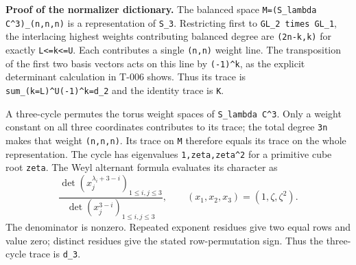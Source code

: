 \documentclass[
  10pt,
]{article}
\begin{document}
\textbf{Proof of the normalizer dictionary.} The balanced space
\texttt{\small M=\allowbreak{}(\allowbreak{}S\_\allowbreak{}lambda C\textasciicircum{}3)\allowbreak{}\_\allowbreak{}(\allowbreak{}n,\allowbreak{}n,\allowbreak{}n)\allowbreak{}}
is a representation of \texttt{\small S\_\allowbreak{}3}. Restricting
first to \texttt{\small GL\_\allowbreak{}2 times GL\_\allowbreak{}1},
the interlacing highest weights contributing balanced degree are
\texttt{\small (\allowbreak{}2n-\allowbreak{}k,\allowbreak{}k)\allowbreak{}}
for exactly \texttt{\small L<=\allowbreak{}k<=\allowbreak{}U}. Each
contributes a single
\texttt{\small (\allowbreak{}n,\allowbreak{}n)\allowbreak{}} weight
line. The transposition of the first two basis vectors acts on this line
by
\texttt{\small (\allowbreak{}-\allowbreak{}1)\allowbreak{}\textasciicircum{}k},
as the explicit determinant calculation in T-006 shows. Thus its trace
is
\texttt{\small sum\_\allowbreak{}(\allowbreak{}k=\allowbreak{}L)\allowbreak{}\textasciicircum{}U(\allowbreak{}-\allowbreak{}1)\allowbreak{}\textasciicircum{}k=\allowbreak{}d\_\allowbreak{}2}
and the identity trace is \texttt{\small K}.

A three-cycle permutes the torus weight spaces of
\texttt{\small S\_\allowbreak{}lambda C\textasciicircum{}3}. Only a
weight constant on all three coordinates contributes to its trace; the
total degree \texttt{\small 3n} makes that weight
\texttt{\small (\allowbreak{}n,\allowbreak{}n,\allowbreak{}n)\allowbreak{}}.
Its trace on \texttt{\small M} therefore equals its trace on the whole
representation. The cycle has eigenvalues
\texttt{\small 1,\allowbreak{}zeta,\allowbreak{}zeta\textasciicircum{}2}
for a primitive cube root \texttt{\small zeta}. The Weyl alternant
formula evaluates its character as \[
\frac{\det(x_j^{\lambda_i+3-i})_{1\le i,j\le3}}
{\det(x_j^{3-i})_{1\le i,j\le3}},
\qquad(x_1,x_2,x_3)=(1,\zeta,\zeta^2).
\] The denominator is nonzero. Repeated exponent residues give two equal
rows and value zero; distinct residues give the stated row-permutation
sign. Thus the three-cycle trace is \texttt{\small d\_\allowbreak{}3}.
\end{document}
